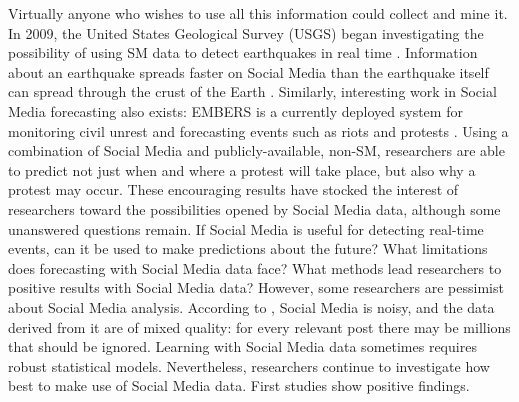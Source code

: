 \documentclass[]{book}
\theoremstyle{definition}
\theoremstyle{definition}
\theoremstyle{definition}
\theoremstyle{remark}
\begin{document}
Virtually anyone who wishes to use all this information could collect
and mine it. In 2009, the United States Geological Survey (USGS) began
investigating the possibility of using SM data to detect earthquakes in
real time \citep{ellis2015usgs}. Information about an earthquake spreads
faster on Social Media than the earthquake itself can spread through the
crust of the Earth \citep{konkel2013tweets}. Similarly, interesting work
in Social Media forecasting also exists: EMBERS is a currently deployed
system for monitoring civil unrest and forecasting events such as riots
and protests \citep{ramakrishnan2014beating}. Using a combination of
Social Media and publicly-available, non-SM, researchers are able to
predict not just when and where a protest will take place, but also why
a protest may occur. These encouraging results have stocked the interest
of researchers toward the possibilities opened by Social Media data,
although some unanswered questions remain. If Social Media is useful for
detecting real-time events, can it be used to make predictions about the
future? What limitations does forecasting with Social Media data face?
What methods lead researchers to positive results with Social Media
data? However, some researchers are pessimist about Social Media
analysis. According to \citep{ruths2014social, weller2015accepting},
Social Media is noisy, and the data derived from it are of mixed
quality: for every relevant post there may be millions that should be
ignored. Learning with Social Media data sometimes requires robust
statistical models. Nevertheless, researchers continue to investigate
how best to make use of Social Media data. First studies show positive
findings.
\end{document}

